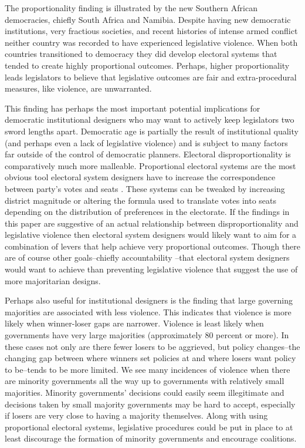 \documentclass[a4paper]{article}\usepackage{graphicx, color}
\begin{document}
The proportionality finding is illustrated by the new Southern African democracies, chiefly South Africa and Namibia. Despite having new democratic institutions, very fractious societies, and recent histories of intense armed conflict neither country was recorded to have experienced legislative violence. When both countries transitioned to democracy they did develop electoral systems that tended to create highly proportional outcomes. Perhaps, higher proportionality leads legislators to believe that legislative outcomes are fair and extra-procedural measures, like violence, are unwarranted.    

This finding has perhaps the most important potential implications for democratic institutional designers who may want to actively keep legislators two sword lengths apart. Democratic age is partially the result of institutional quality (and perhaps even a lack of legislative violence) and is subject to many factors far outside of the control of democratic planners. Electoral disproportionality is comparatively much more malleable. Proportional electoral systems are the most obvious tool electoral system designers have to increase the correspondence between party's votes and seats \citep{Carey2011}. These systems can be tweaked by increasing district magnitude or altering the formula used to translate votes into seats depending on the distribution of preferences in the electorate. If the findings in this paper are suggestive of an actual relationship between disproportionality and legislative violence then electoral system designers would likely want to aim for a combination of levers that help achieve very proportional outcomes. Though there are of course other goals--chiefly accountability \citep{Lijphart1984, Powell2000}--that electoral system designers would want to achieve than preventing legislative violence that suggest the use of more majoritarian designs. 

Perhaps also useful for institutional designers is the finding that large governing majorities are associated with less violence. This indicates that violence is more likely when winner-loser gaps are narrower. Violence is least likely when governments have very large majorities (approximately 80 percent or more). In these cases not only are there fewer losers to be aggrieved, but policy changes--the changing gap between where winners set policies at and where losers want policy to be--tends to be more limited. We see many incidences of violence when there are minority governments all the way up to governments with relatively small majorities. Minority governments' decisions could easily seem illegitimate and decisions taken by small majority governments may be hard to accept, especially if losers are very close to having a majority themselves. Along with using proportional electoral systems, legislative procedures could be put in place to at least discourage the formation of minority governments and encourage coalitions. %
\end{document}
